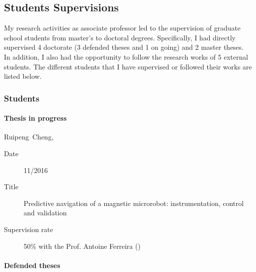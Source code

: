 \SkipAndBreak

\subsection{Students Supervisions}\label{sec:CV:supervision}
My research activities as associate professor led to the supervision of graduate school students from master's to doctoral degrees.
Specifically, I had directly supervised 4 doctorate (3 defended theses and 1 on going) and 2 master theses.
In addition, I also had the opportunity to follow the research works of 5 external \PhD students.
The different students that  I have supervised or followed their works are listed below.


\subsubsection[PhD Students]{\PhD Students}\label{sec:CV:PhD}

\paragraph{Thesis in progress}\label{sec:CV:PhD:continue}

\begin{enumerate}[leftmargin=3em,format={\sffamily\bfseries\smaller\color{blue2}},label={[SUP\arabic*]}]
  \item{}\textsf{Ruipeng~Cheng}, 
  \begin{description}
    \item[Date] 11/2016 
    \item[Title] Predictive navigation of a magnetic microrobot:    instrumentation, control and validation
    \item[Supervision rate]  50\% with the Prof. Antoine Ferreira (\INSA \CVL) %
  \end{description}
  \SaveOrder
\end{enumerate}

\paragraph{Defended theses}\label{sec:CV:PhD:defended}

